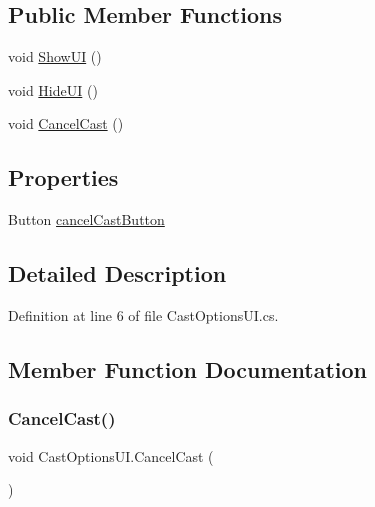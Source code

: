 \subsection*{Public Member Functions}
\begin{DoxyCompactItemize}
\item 
void \mbox{\hyperlink{class_cast_options_u_i_a37c4fa85c666ede5418cd5d7e524ce35}{Show\+UI}} ()
\item 
void \mbox{\hyperlink{class_cast_options_u_i_affc98e48b03c51f4dddda5cb96920697}{Hide\+UI}} ()
\item 
void \mbox{\hyperlink{class_cast_options_u_i_a78fb30f53f8da2443cb801bd878dc149}{Cancel\+Cast}} ()
\end{DoxyCompactItemize}
\subsection*{Properties}
\begin{DoxyCompactItemize}
\item 
Button \mbox{\hyperlink{class_cast_options_u_i_a88e0c5e435183c0f3912bd9eb5a6629f}{cancel\+Cast\+Button}}
\end{DoxyCompactItemize}


\subsection{Detailed Description}


Definition at line 6 of file Cast\+Options\+U\+I.\+cs.



\subsection{Member Function Documentation}
\mbox{\label{class_cast_options_u_i_a78fb30f53f8da2443cb801bd878dc149}} 
\subsubsection{\texorpdfstring{CancelCast()}{CancelCast()}}
{\footnotesize\ttfamily void Cast\+Options\+U\+I.\+Cancel\+Cast (\begin{DoxyParamCaption}{ }\end{DoxyParamCaption})}



